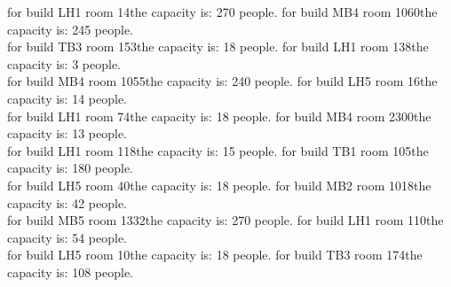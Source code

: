 for build LH1 room 14the capacity is: 270 people.
for build MB4 room 1060the capacity is: 245 people.\\
for build TB3 room 153the capacity is: 18 people.
for build LH1 room 138the capacity is: 3 people.\\
for build MB4 room 1055the capacity is: 240 people.
for build LH5 room 16the capacity is: 14 people.\\
for build LH1 room 74the capacity is: 18 people.
for build MB4 room 2300the capacity is: 13 people.\\
for build LH1 room 118the capacity is: 15 people.
for build TB1 room 105the capacity is: 180 people.\\
for build LH5 room 40the capacity is: 18 people.
for build MB2 room 1018the capacity is: 42 people.\\
for build MB5 room 1332the capacity is: 270 people.
for build LH1 room 110the capacity is: 54 people.\\
for build LH5 room 10the capacity is: 18 people.
for build TB3 room 174the capacity is: 108 people.